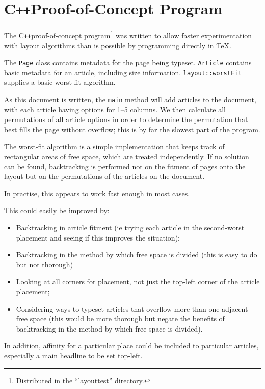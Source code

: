 \documentclass[a4paper]{scrartcl}
\newcommand{\cpp}{\mbox{C\texttt{++}}}
\begin{document}
\section*{\cpp Proof-of-Concept Program}

The \cpp proof-of-concept program\footnote{Distributed in the
  ``layouttest'' directory.} was written to allow faster
experimentation with layout algorithms than is possible by programming
directly in \TeX.

The \texttt{Page} class contains metadata for the page being typeset.
\texttt{Article} contains basic metadata for an article, including
size information.
\texttt{layout::worstFit} supplies a basic worst-fit algorithm.

As this document is written, the \texttt{main} method will add
articles to the document, with each article having options for 1--5
columns. We then calculate all permutations of all article options in
order to determine the permutation that best fills the page without
overflow; this is by far the slowest part of the program.

The worst-fit algorithm is a simple implementation that keeps track of
rectangular areas of free space, which are treated independently. If
no solution can be found, backtracking is performed not on the fitment
of pages onto the layout but on the permutations of the articles on
the document.

In practise, this appears to work fast enough in most cases.

This could easily be improved by:

\begin{itemize}
\item Backtracking in article fitment (ie trying each article in the
  second-worst placement and seeing if this improves the situation);
\item Backtracking in the method by which free space is divided (this
  is easy to do but not thorough)
\item Looking at all corners for placement, not just the top-left
  corner of the article placement;
\item Considering ways to typeset articles that overflow more than one
  adjacent free space (this would be more thorough but negate the
  benefits of backtracking in the method by which free space is
  divided).
\end{itemize}

In addition, affinity for a particular place could be included to
particular articles, especially a main headline to be set top-left.
\end{document}
